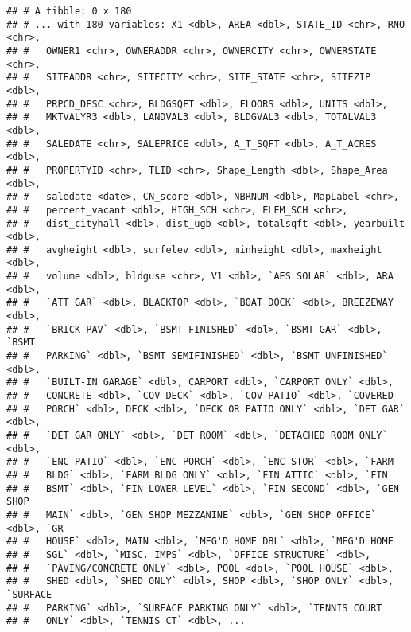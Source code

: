 \documentclass[]{article}
\newenvironment{Shaded}{\begin{snugshade}}{\end{snugshade}}
\newcommand{\DataTypeTok}[1]{\textcolor[rgb]{0.13,0.29,0.53}{#1}}
\newcommand{\KeywordTok}[1]{\textcolor[rgb]{0.13,0.29,0.53}{\textbf{#1}}}
\newcommand{\NormalTok}[1]{#1}
\newcommand{\OperatorTok}[1]{\textcolor[rgb]{0.81,0.36,0.00}{\textbf{#1}}}
\newcommand{\OtherTok}[1]{\textcolor[rgb]{0.56,0.35,0.01}{#1}}
\newcommand{\StringTok}[1]{\textcolor[rgb]{0.31,0.60,0.02}{#1}}
\begin{document}
\begin{Shaded}
\end{Shaded}

\begin{verbatim}
## # A tibble: 0 x 180
## # ... with 180 variables: X1 <dbl>, AREA <dbl>, STATE_ID <chr>, RNO <chr>,
## #   OWNER1 <chr>, OWNERADDR <chr>, OWNERCITY <chr>, OWNERSTATE <chr>,
## #   SITEADDR <chr>, SITECITY <chr>, SITE_STATE <chr>, SITEZIP <dbl>,
## #   PRPCD_DESC <chr>, BLDGSQFT <dbl>, FLOORS <dbl>, UNITS <dbl>,
## #   MKTVALYR3 <dbl>, LANDVAL3 <dbl>, BLDGVAL3 <dbl>, TOTALVAL3 <dbl>,
## #   SALEDATE <chr>, SALEPRICE <dbl>, A_T_SQFT <dbl>, A_T_ACRES <dbl>,
## #   PROPERTYID <chr>, TLID <chr>, Shape_Length <dbl>, Shape_Area <dbl>,
## #   saledate <date>, CN_score <dbl>, NBRNUM <dbl>, MapLabel <chr>,
## #   percent_vacant <dbl>, HIGH_SCH <chr>, ELEM_SCH <chr>,
## #   dist_cityhall <dbl>, dist_ugb <dbl>, totalsqft <dbl>, yearbuilt <dbl>,
## #   avgheight <dbl>, surfelev <dbl>, minheight <dbl>, maxheight <dbl>,
## #   volume <dbl>, bldguse <chr>, V1 <dbl>, `AES SOLAR` <dbl>, ARA <dbl>,
## #   `ATT GAR` <dbl>, BLACKTOP <dbl>, `BOAT DOCK` <dbl>, BREEZEWAY <dbl>,
## #   `BRICK PAV` <dbl>, `BSMT FINISHED` <dbl>, `BSMT GAR` <dbl>, `BSMT
## #   PARKING` <dbl>, `BSMT SEMIFINISHED` <dbl>, `BSMT UNFINISHED` <dbl>,
## #   `BUILT-IN GARAGE` <dbl>, CARPORT <dbl>, `CARPORT ONLY` <dbl>,
## #   CONCRETE <dbl>, `COV DECK` <dbl>, `COV PATIO` <dbl>, `COVERED
## #   PORCH` <dbl>, DECK <dbl>, `DECK OR PATIO ONLY` <dbl>, `DET GAR` <dbl>,
## #   `DET GAR ONLY` <dbl>, `DET ROOM` <dbl>, `DETACHED ROOM ONLY` <dbl>,
## #   `ENC PATIO` <dbl>, `ENC PORCH` <dbl>, `ENC STOR` <dbl>, `FARM
## #   BLDG` <dbl>, `FARM BLDG ONLY` <dbl>, `FIN ATTIC` <dbl>, `FIN
## #   BSMT` <dbl>, `FIN LOWER LEVEL` <dbl>, `FIN SECOND` <dbl>, `GEN SHOP
## #   MAIN` <dbl>, `GEN SHOP MEZZANINE` <dbl>, `GEN SHOP OFFICE` <dbl>, `GR
## #   HOUSE` <dbl>, MAIN <dbl>, `MFG'D HOME DBL` <dbl>, `MFG'D HOME
## #   SGL` <dbl>, `MISC. IMPS` <dbl>, `OFFICE STRUCTURE` <dbl>,
## #   `PAVING/CONCRETE ONLY` <dbl>, POOL <dbl>, `POOL HOUSE` <dbl>,
## #   SHED <dbl>, `SHED ONLY` <dbl>, SHOP <dbl>, `SHOP ONLY` <dbl>, `SURFACE
## #   PARKING` <dbl>, `SURFACE PARKING ONLY` <dbl>, `TENNIS COURT
## #   ONLY` <dbl>, `TENNIS CT` <dbl>, ...
\end{verbatim}
\end{document}
